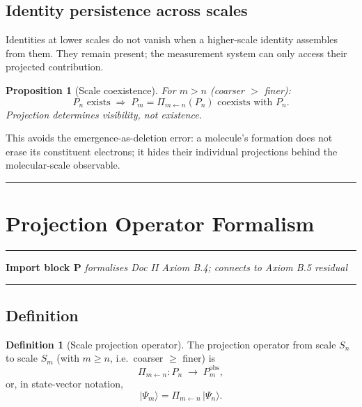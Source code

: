 \documentclass[11pt, a4paper, oneside]{article}
\theoremstyle{definition}
\newtheorem{definition}{Definition}[section]
\theoremstyle{plain}
\newtheorem{proposition}{Proposition}[section]
\theoremstyle{remark}
\newcommand{\Proj}[2]{\Pi_{#1 \leftarrow #2}}
\begin{document}
\subsection{Identity persistence across scales}

Identities at lower scales do not vanish when a higher-scale identity
assembles from them.
They remain present; the measurement system can only access their
projected contribution.

\begin{proposition}[Scale coexistence]
  For $m > n$ (coarser $>$ finer):
  \begin{equation}
    P_n \text{ exists} \;\Longrightarrow\;
    P_m = \Proj{m}{n}(P_n) \text{ coexists with } P_n.
    \label{eq:scale_coexist}
  \end{equation}
  Projection determines \emph{visibility}, not \emph{existence}.
\end{proposition}

\noindent
This avoids the emergence-as-deletion error: a molecule's formation does
not erase its constituent electrons; it hides their individual projections
behind the molecular-scale observable.

\noindent\rule{\linewidth}{0.4pt}

\section{Projection Operator Formalism}
\label{sec:projection}

\noindent\rule{\linewidth}{0.8pt}
\textbf{Import block P} \hfill
  \textit{formalises Doc II Axiom B.4; connects to Axiom B.5 residual}
\noindent\rule{\linewidth}{0.4pt}

\subsection{Definition}

\begin{definition}[Scale projection operator]
  The projection operator from scale $S_n$ to scale $S_m$ (with $m \geq n$,
  i.e.\ coarser $\geq$ finer) is
  \begin{equation}
    \Proj{m}{n} : P_n \;\longrightarrow\; P_m^{\mathrm{obs}},
    \label{eq:proj_def}
  \end{equation}
  or, in state-vector notation,
  \begin{equation}
    |\Psi_m\rangle = \Proj{m}{n}\,|\Psi_n\rangle.
    \label{eq:proj_state}
  \end{equation}
\end{definition}
\end{document}
